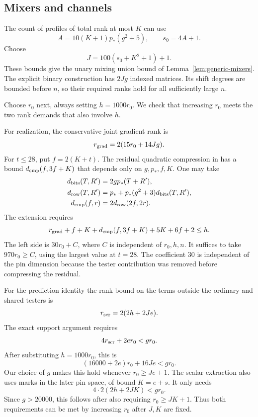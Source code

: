 \subsection{Mixers and channels}

The count of profiles of total rank at most \(K\) can use
\[
 A=10(K+1)p_*(g^2+5),\qquad s_0=4A+1.
\]
Choose
\[
 J=100(s_0+K^2+1)+1.
\]
These bounds give the unary mixing union bound of
Lemma~\ref{lem:generic-mixers}. The explicit binary construction has \(2Jg\)
indexed matrices. Its shift degrees are bounded before \(n\), so their
required ranks hold for all sufficiently large \(n\).

Choose \(r_0\) next, always setting \(h=1000r_0\). We check that increasing
\(r_0\) meets the two rank demands that also involve \(h\).

For realization, the conservative joint gradient rank is
\[
 r_{\rm grad}=2(15r_0+14Jg).
\]
For \(t\le28\), put \(f=2(K+t)\). The residual quadratic compression
in  has a bound \(d_{\rm cmp}(f,3f+K)\) that depends
only on \(g,p_*,f,K\). One may take
\[
 \begin{split}
 d_{\rm bits}(T,R')&=2g p_*(T+R'),\\
 d_{\rm row}(T,R')&=p_*+p_*(g^2+3)d_{\rm bits}(T,R'),\\
 d_{\rm cmp}(f,r)&=2d_{\rm row}(2f,2r).
 \end{split}
\]
The extension requires
\begin{equation}\label{eq:ledger-realization}
 r_{\rm grad}+f+K+d_{\rm cmp}(f,3f+K)+5K+6f+2\le h.
\end{equation}
The left side is \(30r_0+C\), where \(C\) is independent of \(r_0,h,n\).
It suffices to take \(970r_0\ge C\), using the largest value at \(t=28\).
The coefficient 30 is independent of the pin dimension because the
tester contribution was removed before compressing the residual.

For the prediction identity the rank bound on the terms outside the
ordinary and shared testers is
\[
 r_{\rm scr}=2(2h+2Je).
\]
The exact support argument requires
\begin{equation}\label{eq:ledger-tester}
 4r_{\rm scr}+2er_0<gr_0.
\end{equation}
After substituting \(h=1000r_0\), this is
\[
 (16000+2e)r_0+16Je<gr_0.
\]
Our choice of \(g\) makes this hold whenever \(r_0\ge Je+1\).
The scalar extraction also uses marks in the later pin space, of bound
\(K=e+s\). It only needs
\[
 4\cdot2(2h+2JK)<gr_0.
\]
Since \(g>20000\), this follows after also requiring \(r_0\ge JK+1\).
Thus both requirements can be met by increasing \(r_0\) after
\(J,K\) are fixed.

